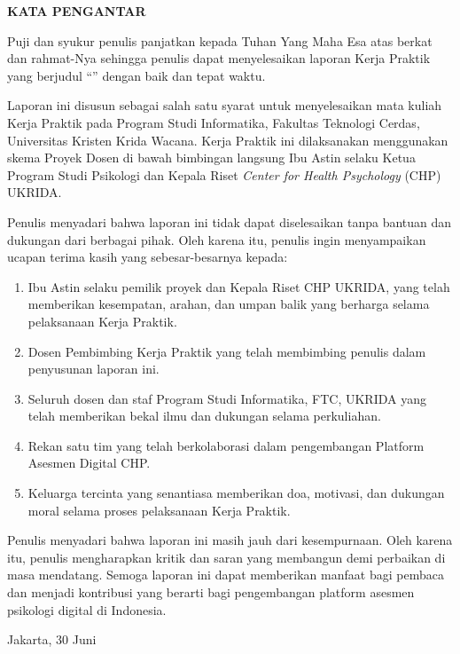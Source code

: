 \clearpage
{}
{}

\begin{center}
  {\fontsize{14}{16}\selectfont\bfseries KATA PENGANTAR}
\end{center}

\vspace{1cm}

Puji dan syukur penulis panjatkan kepada Tuhan Yang Maha Esa atas berkat dan rahmat-Nya sehingga penulis dapat menyelesaikan laporan Kerja Praktik yang berjudul ``\judulLaporan'' dengan baik dan tepat waktu.

Laporan ini disusun sebagai salah satu syarat untuk menyelesaikan mata kuliah Kerja Praktik pada Program Studi Informatika, Fakultas Teknologi Cerdas, Universitas Kristen Krida Wacana. Kerja Praktik ini dilaksanakan menggunakan skema Proyek Dosen di bawah bimbingan langsung Ibu Astin selaku Ketua Program Studi Psikologi dan Kepala Riset \textit{Center for Health Psychology} (CHP) UKRIDA.

Penulis menyadari bahwa laporan ini tidak dapat diselesaikan tanpa bantuan dan dukungan dari berbagai pihak. Oleh karena itu, penulis ingin menyampaikan ucapan terima kasih yang sebesar-besarnya kepada:

\begin{enumerate}[leftmargin=2cm]
  \item Ibu Astin selaku pemilik proyek dan Kepala Riset CHP UKRIDA, yang telah memberikan kesempatan, arahan, dan umpan balik yang berharga selama pelaksanaan Kerja Praktik.
  \item Dosen Pembimbing Kerja Praktik yang telah membimbing penulis dalam penyusunan laporan ini.
  \item Seluruh dosen dan staf Program Studi Informatika, FTC, UKRIDA yang telah memberikan bekal ilmu dan dukungan selama perkuliahan.
  \item Rekan satu tim yang telah berkolaborasi dalam pengembangan Platform Asesmen Digital CHP.
  \item Keluarga tercinta yang senantiasa memberikan doa, motivasi, dan dukungan moral selama proses pelaksanaan Kerja Praktik.
\end{enumerate}

Penulis menyadari bahwa laporan ini masih jauh dari kesempurnaan. Oleh karena itu, penulis mengharapkan kritik dan saran yang membangun demi perbaikan di masa mendatang. Semoga laporan ini dapat memberikan manfaat bagi pembaca dan menjadi kontribusi yang berarti bagi pengembangan platform asesmen psikologi digital di Indonesia.

\vspace{2cm}

\noindent
\begin{flushright}
  Jakarta, 30 Juni \tahunSidang\\[1.5cm]
  \namaMahasiswa
\end{flushright}
